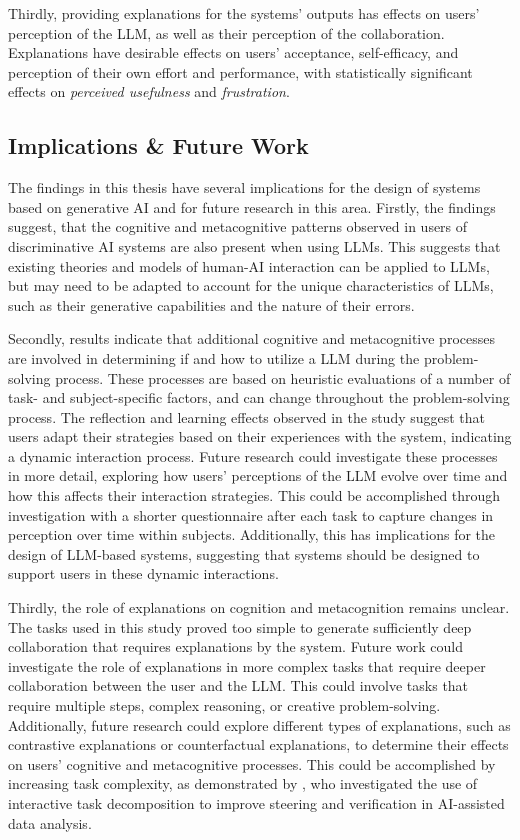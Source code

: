 Thirdly, providing explanations for the systems' outputs has effects on users' perception of the \ac{LLM}, as well as their perception of the collaboration. Explanations have desirable effects on users' acceptance, self-efficacy, and perception of their own effort and performance, with statistically significant effects on \textit{perceived usefulness} and \textit{frustration}.

\subsection{Implications \& Future Work} \label{ssec:implications}

The findings in this thesis have several implications for the design of systems based on generative \ac{AI} and for future research in this area. Firstly, the findings suggest, that the cognitive and metacognitive patterns observed in users of discriminative \ac{AI} systems are also present when using \acp{LLM}. This suggests that existing theories and models of human-AI interaction can be applied to \acp{LLM}, but may need to be adapted to account for the unique characteristics of \acp{LLM}, such as their generative capabilities and the nature of their errors.

Secondly, results indicate that additional cognitive and metacognitive processes are involved in determining if and how to utilize a \ac{LLM} during the problem-solving process. These processes are based on heuristic evaluations of a number of task- and subject-specific factors, and can change throughout the problem-solving process. The reflection and learning effects observed in the study suggest that users adapt their strategies based on their experiences with the system, indicating a dynamic interaction process. Future research could investigate these processes in more detail, exploring how users' perceptions of the \ac{LLM} evolve over time and how this affects their interaction strategies. This could be accomplished through investigation with a shorter questionnaire after each task to capture changes in perception over time within subjects. Additionally, this has implications for the design of \ac{LLM}-based systems, suggesting that systems should be designed to support users in these dynamic interactions.

Thirdly, the role of explanations on cognition and metacognition remains unclear. The tasks used in this study proved too simple to generate sufficiently deep collaboration that requires explanations by the system. Future work could investigate the role of explanations in more complex tasks that require deeper collaboration between the user and the \ac{LLM}. This could involve tasks that require multiple steps, complex reasoning, or creative problem-solving. Additionally, future research could explore different types of explanations, such as contrastive explanations or counterfactual explanations, to determine their effects on users' cognitive and metacognitive processes. This could be accomplished by increasing task complexity, as demonstrated by \textcite{Kazemitabaar2024}, who investigated the use of interactive task decomposition to improve steering and verification in AI-assisted data analysis.

